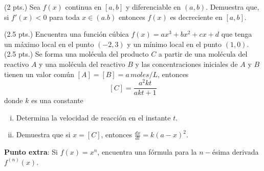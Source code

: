 \documentclass[12pt]{exam}
\begin{document}
\begin{questions}
     \question (2 pts.)
       Sea $f(x)$ continua en $[a,b]$ y diferenciable en $(a,b)$. Demuestra que, si $f'(x)<0$ para toda $x\in (a.b)$ entonces $f(x)$ es decreciente en $[a,b]$.
    
\vskip10pt
     \question (2.5 pts.)
       Encuentra una función cúbica $f(x)=ax^3+bx^2+cx+d$ que tenga un máximo local en el punto $(-2,3)$ y un mínimo local en el punto $(1,0)$. 
\vskip10pt
    \question  (2.5 pts.) Se forma una molécula del producto $C$ a partir de una molécula del reactivo $A$ y una molécula del reactivo $B$ y las concentraciones iniciales de $A$ y $B$ tienen un valor común $[A]=[B]=a\,moles/L$, entonces
    $$[C]=\frac{a^2kt}{akt+1}$$
    donde $k$ es una constante
    \begin{enumerate}[i)]
        \item Determina la velocidad de reacción en el instante $t$.
        \item Demuestra que si $x=[C]$, entonces $\frac{dx}{dt}=k(a-x)^2$.
    \end{enumerate}{}
\vskip10pt
\textbf{Punto extra}: Si $f(x)=x^n$, encuentra una fórmula para la $n-$ésima derivada $f^{(n)}(x)$.


    
        \end{questions}
        \vskip30pt
 \RaggedRight
     
    \newpage



\pagestyle{foot}    %
\end{document}
